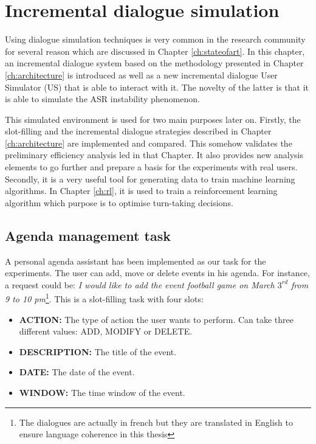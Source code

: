 \chapter{Incremental dialogue simulation}
\label{ch:simulation}
	Using dialogue simulation techniques is very common in the research community\cite{Eckert1997,Pietquin2013} for several reason which are discussed in Chapter \ref{ch:stateofart}. In this chapter, an incremental dialogue system based on the methodology presented in Chapter \ref{ch:architecture} is introduced as well as a new incremental dialogue User Simulator (US) that is able to interact with it. The novelty of the latter is that it is able to simulate the ASR instability phenomenon.
	
	This simulated environment is used for two main purposes later on. Firstly, the slot-filling and the incremental dialogue strategies described in Chapter \ref{ch:architecture} are implemented and compared. This somehow validates the preliminary efficiency analysis led in that Chapter. It also provides new analysis elements to go further and prepare a basis for the experiments with real users. Secondly, it is a very useful tool for generating data to train machine learning algorithms. In Chapter \ref{ch:rl}, it is used to train a reinforcement learning algorithm which purpose is to optimise turn-taking decisions.

\section{Agenda management task}

	A personal agenda assistant has been implemented as our task for the experiments. The user can add, move or delete events in his agenda. For instance, a request could be: \textit{I would like to add the event football game on March $3^{rd}$ from 9 to 10 pm}\footnote{The dialogues are actually in french but they are translated in English to ensure language coherence in this thesis}. This is a slot-filling task with four slots:
    
    \begin{itemize}
    	\item \textbf{ACTION:} The type of action the user wants to perform. Can take three different values: ADD, MODIFY or DELETE.
        \item \textbf{DESCRIPTION:} The title of the event.
        \item \textbf{DATE:} The date of the event.
        \item \textbf{WINDOW:} The time window of the event.
    \end{itemize}
    
